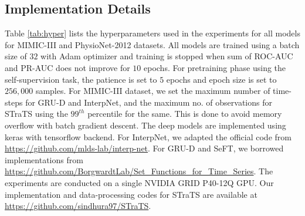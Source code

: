 \subsection{Implementation Details}
Table \ref{tab:hyper} lists the hyperparameters  used in the experiments for all models for MIMIC-III and PhysioNet-2012 datasets.
All models are trained using a batch size of $32$ with Adam optimizer and training is stopped when sum of ROC-AUC and PR-AUC does not improve for $10$ epochs. 
For pretraining phase using the self-supervision task, the patience is set to $5$ epochs and epoch size is set to $256,000$ samples.
For MIMIC-III dataset, we set the maximum number of time-steps for GRU-D and InterpNet, and the maximum no. of observations for STraTS using the $99^{th}$ percentile for the same. This is done to avoid memory overflow with batch gradient descent.
The deep models are implemented using keras with tensorflow backend. 
For InterpNet, we adapted the official code from \url{https://github.com/mlds-lab/interp-net}. For GRU-D and SeFT, we borrowed implementations from \url{https://github.com/BorgwardtLab/Set_Functions_for_Time_Series}.
The experiments are conducted on a single NVIDIA GRID P40-12Q GPU. Our implementation and data-processing codes for STraTS are available at \url{https://github.com/sindhura97/STraTS}. 





\begin{comment}
\begin{table}[h!]
    \centering
    \begin{tabular}{|l|cc|}
      \hline
       &macro ROC-AUC &micro ROC-AUC\\
      \hline
      RF &$0.652\pm0.002$ &$0.650\pm0.002$ \\
      GRU &$0.730\pm0.002$ &$0.740\pm0.011$\\
      GRU-D &$0.802\pm0.002$ &$0.816\pm0.002$\\
      TCN &$0.755\pm0.004$ &$0.766\pm0.005$ \\
      InterpNet &$0.784\pm0.003$ &$0.792\pm0.005$ \\
      \hline
      STraTS$_{\text{agg}}$  &$0.793\pm0.002$ &$0.801\pm0.002$ \\
      STraTS$_{\text{cve-ss-}}$ &$0.794\pm0.003$ &$0.799\pm0.004$ \\
      STraTS$_{\text{ss-}}$ &$0.809\pm0.002$ &$\mathbf{0.819\pm0.004}$ \\
      STraTS &$\mathbf{0.811\pm 0.003}$ &$0.818\pm0.004$\\
      \hline
    \end{tabular}
    \caption{Phenotype classification performance on MIMIC-III dataset.}
    \label{tab:pred_phen}
\end{table}
\end{comment}

